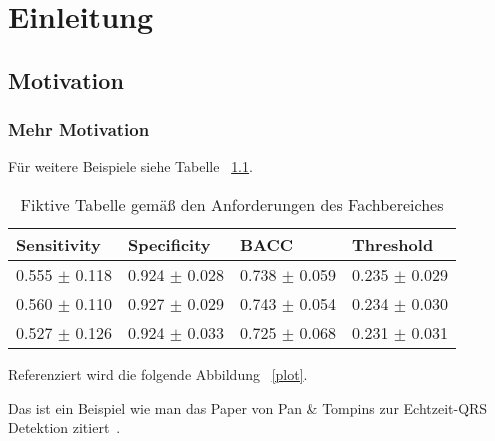 \chapter{Einleitung}


\blindtext

\section{Motivation}
\blindtext

\subsection{Mehr Motivation}
\blindtext
Für weitere Beispiele siehe Tabelle ~\ref{perflogcross}.


\begin{table}[h]
	\centering
	\begin{threeparttable}
		\begin{tabular}{llll}
			\toprule
			{Sensitivity} & {Specificity} & {BACC}& {Threshold} \\
			\midrule
			0.555 $\pm$ 0.118 & 0.924 $\pm$ 0.028 & 0.738 $\pm$ 0.059 & 0.235 $\pm$ 0.029 \\
			0.560 $\pm$ 0.110 & 0.927 $\pm$ 0.029 & 0.743 $\pm$ 0.054 & 0.234 $\pm$ 0.030 \\
			0.527 $\pm$ 0.126 & 0.924 $\pm$ 0.033 & 0.725 $\pm$ 0.068 & 0.231 $\pm$ 0.031 \\ 
			\bottomrule
		\end{tabular}
	\caption{Fiktive Tabelle gemäß den Anforderungen des Fachbereiches}
	\label{perflogcross}
	\end{threeparttable}
\end{table}

\blindtext

Referenziert wird die folgende Abbildung ~\ref{plot}.

\begin{figure}[h]

	\centering
\end{figure}

Das ist ein Beispiel wie man das Paper von Pan \& Tompins zur Echtzeit-QRS Detektion zitiert~\cite{pan_real-time_1985}.